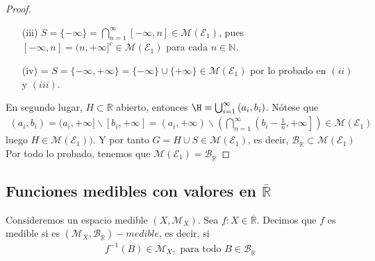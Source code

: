 \begin{proof}
\begin{enumerate}
    \item[(iii)] $S = \{ -\infty \} = \bigcap_{n=1}^{\infty}{[-\infty,n]} \in \mathcal{M}(\mathcal{E}_1)$, pues $[-\infty,n] = (n, +\infty]^c \in \mathcal{M}(\mathcal{E}_1)$ para cada $n \in \mathbb{N}$.
    \item[(iv)] = $S = \{ -\infty, +\infty \} = \{ -\infty \} \cup \{ +\infty\} \in \mathcal{M}(\mathcal{E}_1)$ por lo probado en $(ii)$ y $(iii)$.
\end{enumerate}
En segundo lugar, $H \subset \mathbb{R}$ abierto, entonces $\H = \bigcup_{i=1}^{\infty}{(a_i,b_i)}$. Nótese que
\begin{align*}
    (a_i,b_i) = (a_i,+\infty] \backslash [b_i, +\infty] = (a_i, +\infty) \backslash \left( \bigcap_{n=1}^{\infty}{\left( b_i - \frac{1}{n}, +\infty\right] } \right) \in \mathcal{M}(\mathcal{E}_1)
\end{align*}
luego $H \in \mathcal{M}(\mathcal{E}_1))$. Y por tanto $G = H \cup S \in \mathcal{M}(\mathcal{E}_1)$, es decir,  $\mathcal{B}_{\overline{\mathbb{R}}} \subset \mathcal{M}(\mathcal{E}_1)$
\\
\newline
Por todo lo probado, tenemos que $\mathcal{M}(\mathcal{E}_1) = \mathcal{B}_{\overline{\mathbb{R}}}$
\end{proof}

\subsection{Funciones medibles con valores en $\overline{\mathbb{R}}$}
\begin{defi}
Consideremos un espacio medible $(X, \mathcal{M}_X)$. Sea $f: X \in \overline{\mathbb{R}}$. Decimos que $f$ es medible si es $(\mathcal{M}_X, \mathcal{B}_{\overline{\mathbb{R}}})-medible$, es decir, si
\begin{align*}
    f^{-1}(B) \in \mathcal{M}_X, \text{ \ \ \ para todo } B \in \mathcal{B}_{\overline{\mathbb{R}}}
\end{align*}
\end{defi}

